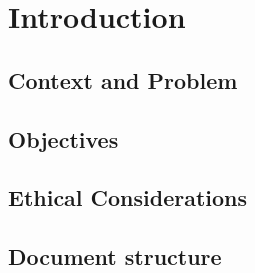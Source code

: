 % 
\chapter{Introduction} %
\label{chap:Chapter1} %


%
\section{Context and Problem} 

\section{Objectives}

\section{Ethical Considerations}

\section{Document structure} 